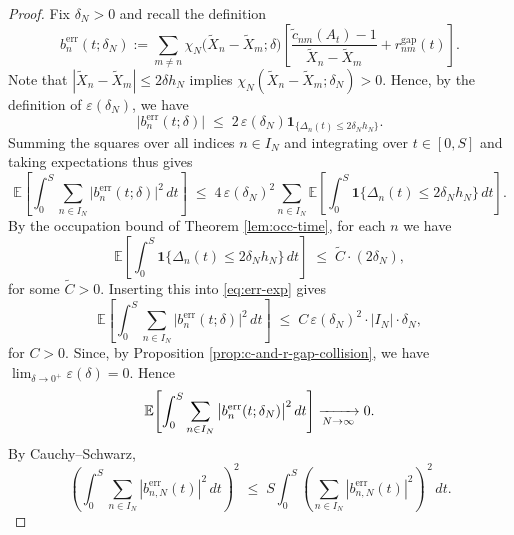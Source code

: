 \documentclass[12pt,reqno]{amsart}
\theoremstyle{plain}
\theoremstyle{definition}
\theoremstyle{remark}
\begin{document}
\begin{proof}
Fix $\delta_N>0$ and recall the definition
\begin{equation} 
b^{\mathrm{err}}_{n}(t ;\delta_N )
:= \sum_{m \neq n}\chi_N\!\big(\widetilde X_n-\widetilde X_m ; \delta \big)
\left[
\frac{\widetilde c_{nm}(A_t)-1}{\widetilde X_n-\widetilde X_m}
+ r^{\mathrm{gap}}_{nm}(t)
\right].
\end{equation}
Note that $|\widetilde X_n-\widetilde X_m|\le 2\delta h_N$ implies $\chi_N(\widetilde X_n-\widetilde X_m;  \delta_N)>0$. Hence, by the definition of $\varepsilon(\delta_N)$, we have
\begin{equation}
\label{eq:304}
\big|b^{\mathrm{err}}_{n}(t ;\delta)\big|\;\le\; 2\,\varepsilon(\delta_N)
\mathbf{1}_{\{\Delta_n(t)\le 2\delta_N h_N\}}.
\end{equation}
Summing the squares over all indices $n\in I_N$ and integrating over $t\in[0,S]$ and taking expectations thus gives 
\begin{equation}\label{eq:err-exp}
\mathbb{E}\!\left[\int_0^S \sum_{n\in I_N}\big|b^{\mathrm{err}}_{n}(t ; \delta)\big|^2\,dt\right]
\;\le\; 4\,\varepsilon(\delta_N)^2
\sum_{n\in I_N}\mathbb{E}\!\left[\int_0^S \mathbf{1}\{\Delta_n(t)\le 2\delta_N h_N\}\,dt\right].
\end{equation}
By the occupation bound of 
Theorem \ref{lem:occ-time}, for each $n$ we have
\begin{equation}
\mathbb{E}\!\left[\int_0^S \mathbf{1}\{\Delta_n(t)\le 2\delta_N h_N\}\,dt\right]
\;\le\; \widetilde{C} \cdot (2\delta_N),
\end{equation}
for some $\widetilde{C}>0$.
Inserting this into \eqref{eq:err-exp} gives
\begin{equation}
\mathbb{E}\!\left[\int_0^S \sum_{n\in I_N}\big|b^{\mathrm{err}}_{n}(t ; \delta)\big|^2\,dt\right]
\;\le\; C\,\varepsilon(\delta_N)^2 \cdot |I_N| \cdot \delta_N,
\end{equation}
for $C>0$. Since, by Proposition \ref{prop:c-and-r-gap-collision}, we have $\lim_{\delta \to 0^+} \varepsilon(\delta) = 0$. Hence 
\begin{equation}
\mathbb{E}\!\left[\int_0^S \sum_{n\in I_N}\big|b^{\mathrm{err}}_{n}(t ; \delta_N)\big|^2\,dt\right]
\xrightarrow[N\to\infty]{\ \\ \ } 0.
\end{equation}
By Cauchy--Schwarz,
\begin{equation}
\label{eq:eq:L2-CS}
\left(\int_0^S \sum_{n\in I_N} |b^{\mathrm{err}}_{n,N}(t)|^2 \,dt\right)^2 \;\le\; S \int_0^S \left (\sum_{n\in I_N} |b^{\mathrm{err}}_{n,N}(t)|^2 \right)^{\,2}\,dt.

\end{equation}
\end{proof}
\end{document}
